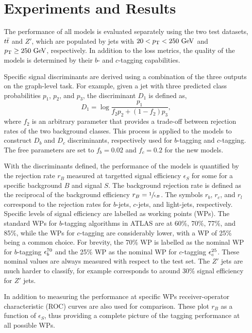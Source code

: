 \section{Experiments and Results}

The performance of all models is evaluated separately using the two test datasets, $t\bar{t}$ and $Z'$, which are populated by jets with $20 < \pt < 250~\GeV$ and $\pt \geq 250~\GeV$, respectively.
In addition to the loss metrics, the quality of the models is determined by their $b$- and $c$-tagging capabilities.

Specific signal discriminants are derived using a combination of the three outputs on the graph-level task.
For example, given a jet with three predicted class probabilities $p_1$, $p_2$, and $p_3$, the discriminant $D_1$ is defined as,
\begin{equation}
    D_1 = \log\frac{p_1}{f_2 p_2 + (1-f_2)p_3},
\end{equation}
where $f_2$ is an arbitrary parameter that provides a trade-off between rejection rates of the two background classes.
This process is applied to the models to construct $D_b$ and $D_c$ discriminants, respectively used for $b$-tagging and $c$-tagging.
The free parameters are set to $f_b=0.02$ and $f_c=0.2$ for the new models.

With the discriminants defined, the performance of the models is quantified by the rejection rate $r_B$ measured at targetted signal efficiency $\epsilon_S$ for some for a specific background $B$ and signal $S$.
The background rejection rate is defined as the reciprocal of the background efficiency $r_B = \sfrac{1}{\epsilon_B}$.
The symbols $r_b$, $r_c$, and $r_l$ correspond to the rejection rates for $b$-jets, $c$-jets, and light-jets, respectively.
Specific levels of signal efficiency are labelled as working points (WPs).
The standard WPs for $b$-tagging algorithms in ATLAS are at 60\%, 70\%, 77\%, and 85\%, while the WPs for $c$-tagging are considerably lower, with a WP of 25\% being a common choice.
For brevity, the 70\% WP is labelled as the nominal WP for $b$-tagging $\epsilon_b^{70}$ and the 25\% WP as the nominal WP for $c$-tagging $\epsilon_c^{25}$.
These nominal values are always measured with respect to the \ttbar test set.
The $Z'$ jets are much harder to classify, for example \bnom corresponds to around 30\% signal efficiency for $Z'$ jets.

In addition to measuring the performance at specific WPs receiver-operator characteristic (ROC) curves are also used for comparison.
These plot $r_B$ as a function of $\epsilon_S$, thus providing a complete picture of the tagging performance at all possible WPs.

